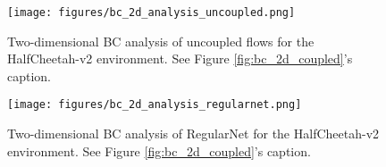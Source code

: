 \begin{figure}[h]
\vskip 0.1in
\centering
\texttt{[image: figures/bc\_2d\_analysis\_uncoupled.png]} %
\caption{Two-dimensional BC analysis of uncoupled flows for the HalfCheetah-v2 environment. See Figure \ref{fig:bc_2d_coupled}'s caption.}
\label{fig:bc_2d_uncoupled}
\vskip -0.1in
\end{figure} 

\begin{figure}[h]
\vskip 0.1in
\centering
\texttt{[image: figures/bc\_2d\_analysis\_regularnet.png]} %
\caption{Two-dimensional BC analysis of RegularNet for the HalfCheetah-v2 environment. See Figure \ref{fig:bc_2d_coupled}'s caption.}
\label{fig:bc_2d_regularnet}
\vskip -0.1in
\end{figure} 

